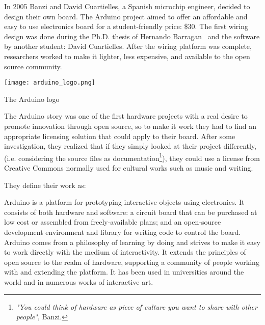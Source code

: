 \begin{row}{4}{2}
    \begin{cell}{3}
      In 2005 Banzi and David Cuartielles, a Spanish microchip engineer, decided to design their own board. The Arduino project aimed to offer an affordable and easy to use electronics board for a student-friendly price: \$30. The first wiring design was done during the Ph.D. thesis of Hernando Barragan~\parencite{barragan2004wiring} and the software by another student: David Cuartielles.
      After the wiring platform was complete, researchers worked to make it lighter, less expensive, and available to the open source community.
    \end{cell}
    \begin{cell}{1}
        \begin{NFfigure}
            \centering
                \texttt{[image: arduino\_logo.png]}
            \caption{The Arduino logo}
            \label{fig:arduino_logo}
        \end{NFfigure}
    \end{cell}
\end{row}

The Arduino story was one of the first hardware projects with a real desire to promote innovation through open source, so to make it work they had to find an appropriate licensing solution that could apply to their board. After some investigation, they realized that if they simply looked at their project differently, (i.e. considering the source files as documentation\footnote{\emph{"You could think of hardware as piece of culture you want to share with other people"}, Banzi. }), they could use a license from Creative Commons normally used for cultural works such as music and writing.

They define their work as:

\begin{formal}
  Arduino is a platform for prototyping interactive objects using electronics. It consists of both hardware and software: a circuit board that can be purchased at low cost or assembled from freely-available plans; and an open-source development environment and library for writing code to control the board. Arduino comes from a philosophy of learning by doing and strives to make it easy to work directly with the medium of interactivity. It extends the principles of open source to the realm of hardware, supporting a community of people working with and extending the platform. It has been used in universities around the world and in numerous works of interactive art.

\end{formal}


